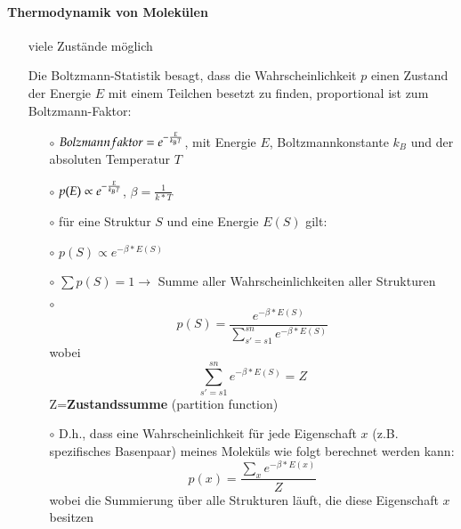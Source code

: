 \paragraph{Thermodynamik von Molek\"ulen}
\begin{itemize}
\item[]viele Zust\"ande m\"oglich
\item[]Die Boltzmann-Statistik besagt, dass die Wahrscheinlichkeit $p$ einen Zustand der Energie $E$ mit einem Teilchen besetzt zu finden, proportional ist zum Boltzmann-Faktor:
	\begin{itemize}
	\item[$\circ$]$Bolzmannfaktor=e^{-\frac{E}{k_B\*T}} $, mit Energie $E$, Boltzmannkonstante $k_B$ und der absoluten Temperatur $T$
	\item[$\circ$]$p(E)\propto e^{-\frac{E}{k_B\*T}}$, $\beta=\frac{1}{k*T}$
	\item[$\circ$]f\"ur eine Struktur $S$ und eine Energie $E(S)$ gilt:
	\item[$\circ$]$p(S)\propto e^{-\beta*E(S)}$
	\item[$\circ$]$\sum p(S) = 1 \rightarrow$ Summe aller Wahrscheinlichkeiten aller Strukturen
	\item[$\circ$]\begin{equation}
	p(S)= \frac{e^{-\beta*E(S)}}{\sum \limits_{s'=s1}^{sn} e^{-\beta*E(S)}}
	\end{equation}wobei \begin{equation}
	\sum \limits_{s'=s1}^{sn} e^{-\beta*E(S)}=Z
	\end{equation}Z=\textbf{Zustandssumme} (partition function)
	\item[$\circ$] D.h., dass eine Wahrscheinlichkeit f\"ur jede Eigenschaft $x$ (z.B. spezifisches Basenpaar) meines Molek\"uls wie folgt berechnet werden kann: \begin{equation}
	p(x)=\frac{\sum \limits_{x}  e^{-\beta*E(x)}}{Z}
	\end{equation}
	wobei die Summierung über alle Strukturen l\"auft, die diese Eigenschaft $x$ besitzen
	\end{itemize}
\end{itemize}




